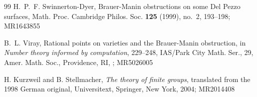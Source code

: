 \documentclass[10pt]{amsart}
\theoremstyle{plain}
\theoremstyle{definition}
\begin{document}
\begin{thebibliography}{99}
H.~P.~F. Swinnerton-Dyer, Brauer-Manin obstructions on some Del Pezzo surfaces, Math. Proc. Cambridge Philos. Soc. {\bf 125} (1999), no.~2, 193--198; MR1643855

B.~L. Viray, Rational points on varieties and the Brauer-Manin obstruction, in {\it Number theory informed by computation}, 229--248, IAS/Park City Math. Ser., 29, Amer. Math. Soc., Providence, RI, ; MR5026005

H. Kurzweil and B. Stellmacher, {\it The theory of finite groups}, translated from the 1998 German original, Universitext, Springer, New York, 2004; MR2014408


\end{thebibliography}
\end{document}
